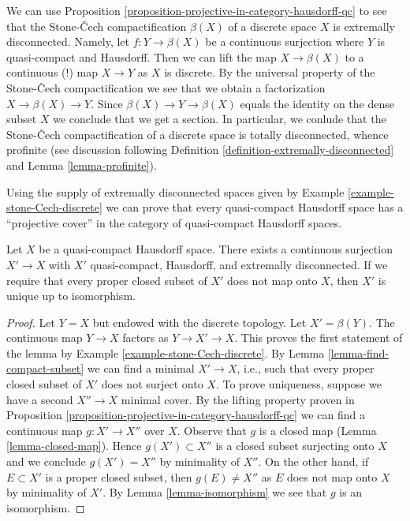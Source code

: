 \begin{example}
\label{example-stone-Cech-discrete}
We can use Proposition \ref{proposition-projective-in-category-hausdorff-qc}
to see that the Stone-{\v C}ech compactification $\beta(X)$ of a discrete
space $X$ is extremally disconnected. Namely, let $f : Y \to \beta(X)$ be
a continuous surjection where $Y$ is quasi-compact and Hausdorff. Then
we can lift the map $X \to \beta(X)$ to a continuous (!) map
$X \to Y$ as $X$ is discrete. By the universal property of the
Stone-{\v C}ech compactification we see that we obtain a factorization
$X \to \beta(X) \to Y$. Since $\beta(X) \to Y \to \beta(X)$ equals
the identity on the dense subset $X$ we conclude that we get a section.
In particular, we conlude that the Stone-{\v C}ech compactification
of a discrete space is totally disconnected, whence profinite
(see discussion following
Definition \ref{definition-extremally-disconnected} and
Lemma \ref{lemma-profinite}).
\end{example}

\noindent
Using the supply of extremally disconnected spaces given by
Example \ref{example-stone-Cech-discrete}
we can prove that every quasi-compact Hausdorff space has a
``projective cover'' in the category of quasi-compact Hausdorff spaces.

\begin{lemma}
\label{lemma-existence-projective-cover}
Let $X$ be a quasi-compact Hausdorff space.
There exists a continuous surjection $X' \to X$ with $X'$
quasi-compact, Hausdorff, and extremally disconnected.
If we require that every proper closed subset of $X'$ does not
map onto $X$, then $X'$ is unique up to isomorphism.
\end{lemma}

\begin{proof}
Let $Y = X$ but endowed with the discrete topology. Let $X' = \beta(Y)$.
The continuous map $Y \to X$ factors as $Y \to X' \to X$. This
proves the first statement of the lemma by
Example \ref{example-stone-Cech-discrete}.
By Lemma \ref{lemma-find-compact-subset} we can find a minimal
$X' \to X$, i.e., such that every proper closed subset of $X'$
does not surject onto $X$.
To prove uniqueness, suppose we have a second $X'' \to X$
minimal cover. By the lifting property proven in
Proposition \ref{proposition-projective-in-category-hausdorff-qc}
we can find a continuous map $g : X' \to X''$ over $X$.
Observe that $g$ is a closed map (Lemma \ref{lemma-closed-map}).
Hence $g(X') \subset X''$ is a closed subset surjecting onto $X$
and we conclude $g(X') = X''$ by minimality of $X''$.
On the other hand, if $E \subset X'$ is a proper closed subset,
then $g(E) \not = X''$ as $E$ does not map onto $X$ by minimality
of $X'$. By Lemma \ref{lemma-isomorphism} we see that $g$ is an isomorphism.
\end{proof}

